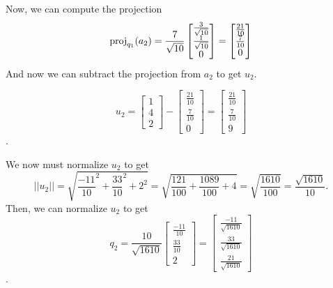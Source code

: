 \documentclass[12pt]{article}
\begin{document}
\begin{enumerate}[leftmargin=0em]
        Now, we can compute the projection
        \[\operatorname{proj}_{q_1}(a_2) = \frac{7}{\sqrt{10}} \begin{bmatrix}
            \frac{3}{\sqrt{10}} \\
            \frac{1}{\sqrt{10}} \\
            0
        \end{bmatrix} = 
        \begin{bmatrix}
            \frac{21}{10} \\
            \frac{7}{10} \\
            0
        \end{bmatrix}\]
     And now we can subtract the projection from $a_2$ to get $u_2$. 

     \[
        u_{2} = \begin{bmatrix}
            1 \\
            4 \\
            2
        \end{bmatrix} - \begin{bmatrix}
            \frac{21}{10} \\
            \frac{7}{10} \\
            0
        \end{bmatrix} = \begin{bmatrix}
            \frac{21}{10} \\
            \frac{7}{10} \\
            9
        \end{bmatrix}\]. 

        We now must normalize $u_2$ to get \[
            ||u_2|| = \sqrt{\frac{-11}{10}^{2} + \frac{33}{10}^{2} + 2^2} = \sqrt{\frac{121}{100} + \frac{1089}{100}  + 4} = 
            \sqrt{\frac{1610}{100}} = \frac{\sqrt{1610}}{10}.
        \]
        Then, we can normalize $u_2$ to get 
        \[q_2 = \frac{10}{\sqrt{1610}} \begin{bmatrix}
            \frac{-11}{10} \\
            \frac{33}{10} \\
            2
        \end{bmatrix} = \begin{bmatrix}
            \frac{-11}{\sqrt{1610}} \\
            \frac{33}{\sqrt{1610}} \\
            \frac{21}{\sqrt{1610}}
        \end{bmatrix}\].


\end{enumerate}
\end{document}
